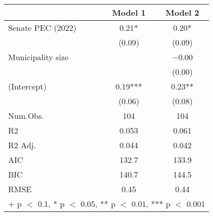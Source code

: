 \begin{table}[h]
\centering
\begin{tabular}[t]{lcc}
\toprule
  & Model 1 & Model 2\\
\midrule
Senate PEC (2022) & \num{0.21}* & \num{0.20}*\\
 & (\num{0.09}) & (\num{0.09})\\
Municipality size &  & \num{-0.00}\\
 &  & (\num{0.00})\\
(Intercept) & \num{0.19}*** & \num{0.23}**\\
 & (\num{0.06}) & (\num{0.08})\\
\midrule
Num.Obs. & \num{104} & \num{104}\\
R2 & \num{0.053} & \num{0.061}\\
R2 Adj. & \num{0.044} & \num{0.042}\\
AIC & \num{132.7} & \num{133.9}\\
BIC & \num{140.7} & \num{144.5}\\
RMSE & \num{0.45} & \num{0.44}\\
\bottomrule
\multicolumn{3}{l}{\rule{0pt}{1em}+ p $<$ 0.1, * p $<$ 0.05, ** p $<$ 0.01, *** p $<$ 0.001}\\
\end{tabular}
\end{table}
